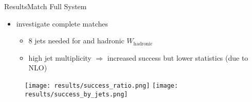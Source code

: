 \documentclass[9pt, aspectratio=169]{beamer}
\begin{document}

\begin{frame}{Results}{Match Full \ttbar System}
	\begin{itemize}
		\item investigate complete \ttbar matches
		\begin{itemize}
			\item 8 jets needed for \ttbar and hadronic $W_\text{hadronic}$
			\item high jet multiplicity $\Rightarrow$ increased success but lower statistics (due to NLO)
	  	\end{itemize}
	\end{itemize}
	\begin{figure}
		\centering
		\texttt{[image: results/success\_ratio.png]}\hspace{.02\textwidth}
		\texttt{[image: results/success\_by\_jets.png]}
	\end{figure}
\end{frame}
\end{document}
